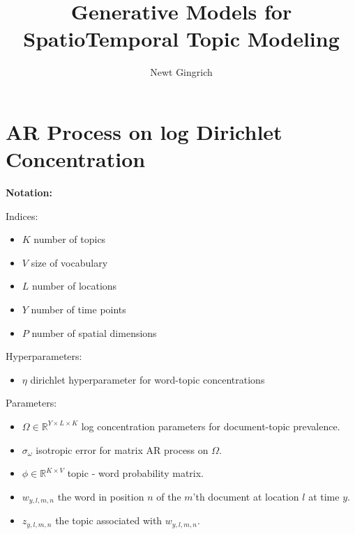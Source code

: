 \documentclass[a4paper]{article}
\title{Generative Models for SpatioTemporal Topic Modeling}
\author{Newt Gingrich}
\begin{document}
\maketitle

\section{AR Process on log Dirichlet Concentration}

\textbf{Notation:}

Indices:
\begin{itemize}
    \item $K$ number of topics
    \item $V$ size of vocabulary
    \item $L$ number of locations
    \item $Y$ number of time points
    \item $P$ number of spatial dimensions
\end{itemize}

Hyperparameters:
\begin{itemize}
    \item $\eta$ dirichlet hyperparameter for word-topic concentrations
\end{itemize}

Parameters:
\begin{itemize}
    \item $\Omega \in \mathbb{R}^{Y\times L\times K}$ log concentration parameters for document-topic prevalence.
    \item $\sigma_{\omega}$ isotropic error for matrix AR process on $\Omega$.
    \item $\phi \in \mathbb{R}^{K\times V}$ topic - word probability matrix.
    \item $w_{y,l,m,n}$ the word in position $n$ of the $m$'th document at location $l$ at time $y$.
    \item $z_{y,l,m,n}$ the topic associated with $w_{y,l,m,n}$.
\end{itemize}
\end{document}
